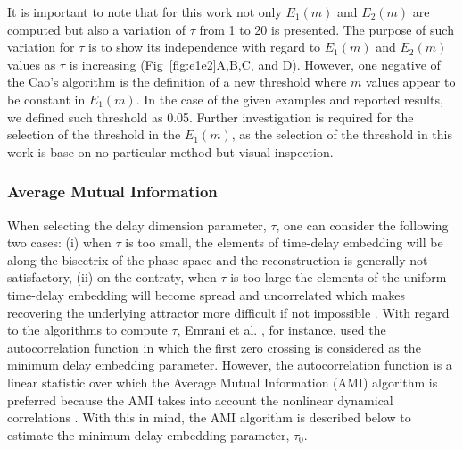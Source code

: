 \documentclass[fleqn,10pt]{wlscirep}
\begin{document}
It is important to note that for this work not only $E_1(m)$ and $E_2(m)$ are 
computed but also a variation of $\tau$ from 1 to 20 is presented. 
The purpose of such variation for $\tau$ is to show its independence with
regard to $E_1(m)$ and $E_2(m)$ values as $\tau$ is increasing 
(Fig~\ref{fig:e1e2}A,B,C, and D). 
However, one negative of the Cao's algorithm \cite{Cao1997} is the definition of 
a new threshold where $m$ values appear to be constant in $E_1 (m)$.
In the case of the given examples and reported results, we defined such 
threshold as 0.05. Further investigation is required for the selection of the 
threshold in the $E_1(m)$, as the selection of the threshold in this work is 
base on no particular method but visual inspection.

\subsubsection*{Average Mutual Information}
When selecting the delay dimension parameter, $\tau$, one can consider the 
following two cases:
(i) when $\tau$ is too small, the elements of time-delay embedding will be along
the bisectrix of the phase space and the reconstruction is generally not 
satisfactory, 
(ii) on the contraty, when $\tau$ is too large the elements of the uniform 
time-delay embedding will become spread and uncorrelated which makes 
recovering the underlying attractor more difficult if not 
impossible \cite{casdagli1991, emrani2014a, garcia2005e71}.
With regard to the algorithms to compute $\tau$, 
Emrani et al. \cite{emrani2014a}, for instance, used the autocorrelation 
function in which the first zero crossing is considered as the minimum delay 
embedding parameter. However, the autocorrelation function is a linear 
statistic over which the Average Mutual Information (AMI) algorithm is 
preferred because the AMI takes into account the nonlinear dynamical 
correlations \cite{afraser1986,krakovska2015}. With this in mind, the AMI 
algorithm is described below to estimate the minimum delay embedding 
parameter, \texorpdfstring{$\tau_0$}{T}.
\end{document}
